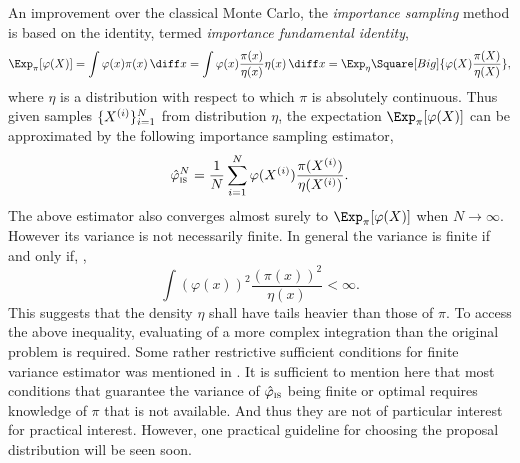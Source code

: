 An improvement over the classical Monte Carlo, the \emph{importance sampling}
method is based on the identity, termed \emph{importance fundamental
  identity},
\begin{equation}
  \Exp_{\pi}[\varphi(X)]
  = \int\varphi(x)\pi(x)\intd x
  = \int\varphi(x)\frac{\pi(x)}{\eta(x)}\eta(x)\intd x
  = \Exp_{\eta}\Square[Big]{\varphi(X)\frac{\pi(X)}{\eta(X)}},
\end{equation}
where $\eta$ is a distribution with respect to which $\pi$ is absolutely
continuous. Thus given \iid samples $\{X^{(i)}\}_{i=1}^N$ from distribution
$\eta$, the expectation $\Exp_{\pi}[\varphi(X)]$ can be approximated by the
following importance sampling estimator,
\begin{equation}
  \hat\varphi_{\text{\textsc{is}}}^N
  = \frac{1}{N}\sum_{i=1}^N\varphi(X^{(i)})\frac{\pi(X^{(i)})}{\eta(X^{(i)})}.
\end{equation}
The above estimator also converges almost surely to $\Exp_{\pi}[\varphi(X)]$
when $N\to\infty$. However its variance is not necessarily finite. In general
the variance is finite if and only if,
\cite[][sec.~3.3.2]{Robert:2004tn},
\begin{equation}
  \int(\varphi(x))^2\frac{(\pi(x))^2}{\eta(x)} < \infty.
\end{equation}
This suggests that the density $\eta$ shall have tails heavier than those of
$\pi$. To access the above inequality, evaluating of a more complex
integration than the original problem is required. Some rather restrictive
sufficient conditions for finite variance estimator was mentioned in
\cite{Geweke:1989tm}. It is sufficient to mention here that most conditions
that guarantee the variance of $\hat\varphi_{\text{\textsc{is}}}$ being finite
or optimal requires knowledge of $\pi$ that is not available. And thus they
are not of particular interest for practical interest. However, one practical
guideline for choosing the proposal distribution will be seen soon.

